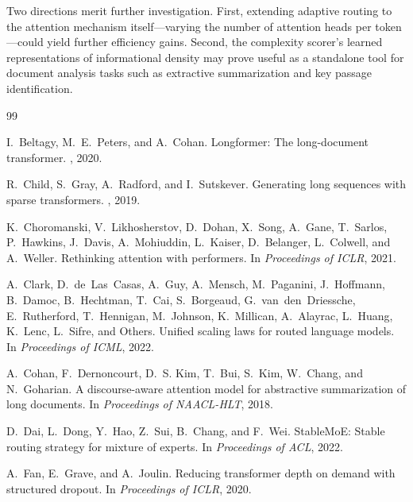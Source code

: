 \documentclass[11pt,a4paper]{article}
\begin{document}
Two directions merit further investigation.
First, extending adaptive routing to the attention mechanism itself---varying the number
of attention heads per token---could yield further efficiency gains.
Second, the complexity scorer's learned representations of informational density may prove
useful as a standalone tool for document analysis tasks such as extractive summarization
and key passage identification.


\begin{thebibliography}{99}

I.~Beltagy, M.~E.~Peters, and A.~Cohan.
\newblock Longformer: The long-document transformer.
, 2020.

R.~Child, S.~Gray, A.~Radford, and I.~Sutskever.
\newblock Generating long sequences with sparse transformers.
, 2019.

K.~Choromanski, V.~Likhosherstov, D.~Dohan, X.~Song, A.~Gane, T.~Sarlos,
  P.~Hawkins, J.~Davis, A.~Mohiuddin, L.~Kaiser, D.~Belanger, L.~Colwell,
  and A.~Weller.
\newblock Rethinking attention with performers.
\newblock In {\em Proceedings of ICLR}, 2021.

A.~Clark, D.~de~Las~Casas, A.~Guy, A.~Mensch, M.~Paganini, J.~Hoffmann,
  B.~Damoc, B.~Hechtman, T.~Cai, S.~Borgeaud, G.~van~den~Driessche,
  E.~Rutherford, T.~Hennigan, M.~Johnson, K.~Millican, A.~Alayrac,
  L.~Huang, K.~Lenc, L.~Sifre, and Others.
\newblock Unified scaling laws for routed language models.
\newblock In {\em Proceedings of ICML}, 2022.

A.~Cohan, F.~Dernoncourt, D.~S. Kim, T.~Bui, S.~Kim, W.~Chang, and
  N.~Goharian.
\newblock A discourse-aware attention model for abstractive summarization of
  long documents.
\newblock In {\em Proceedings of NAACL-HLT}, 2018.

D.~Dai, L.~Dong, Y.~Hao, Z.~Sui, B.~Chang, and F.~Wei.
\newblock StableMoE: Stable routing strategy for mixture of experts.
\newblock In {\em Proceedings of ACL}, 2022.

A.~Fan, E.~Grave, and A.~Joulin.
\newblock Reducing transformer depth on demand with structured dropout.
\newblock In {\em Proceedings of ICLR}, 2020.


\end{thebibliography}
\end{document}
